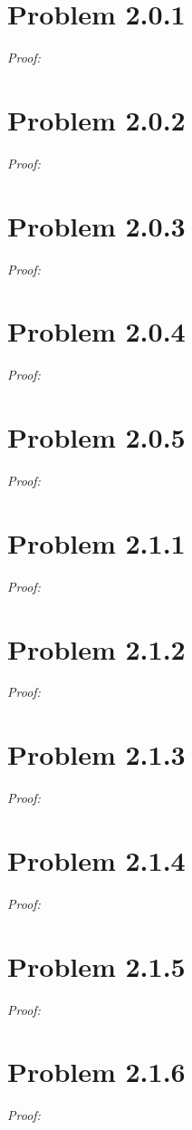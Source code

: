 \documentclass[11pt]{article}
\theoremstyle{definition}
\theoremstyle{remark}
\theoremstyle{problem}
\begin{document}
\newpage
\tableofcontents
\newpage

\section{Problem 2.0.1}
\textit{Proof:}
\newpage

\section{Problem 2.0.2}
\textit{Proof:}
\newpage

\section{Problem 2.0.3}
\textit{Proof:}
\newpage

\section{Problem 2.0.4}
\textit{Proof:}
\newpage

\section{Problem 2.0.5}
\textit{Proof:}
\newpage

\section{Problem 2.1.1}
\textit{Proof:}
\newpage

\section{Problem 2.1.2}
\textit{Proof:}
\newpage

\section{Problem 2.1.3}
\textit{Proof:}
\newpage

\section{Problem 2.1.4}
\textit{Proof:}
\newpage

\section{Problem 2.1.5}
\textit{Proof:}
\newpage

\section{Problem 2.1.6}
\textit{Proof:}
\newpage
\end{document}
